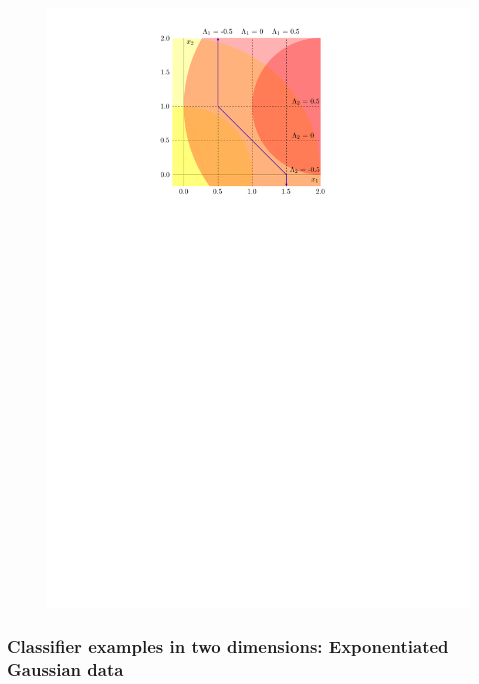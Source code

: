 \begin{figure}[ht]
\begin{minipage}[t]{0.44\linewidth}
    \includegraphics[width=1\textwidth]{gauss_quant_rule}
  \end{minipage}
\end{figure}


\subsubsection{Classifier examples in two dimensions: Exponentiated Gaussian
  data}
\label{sec:classifier-examples-exp-gaussian}


